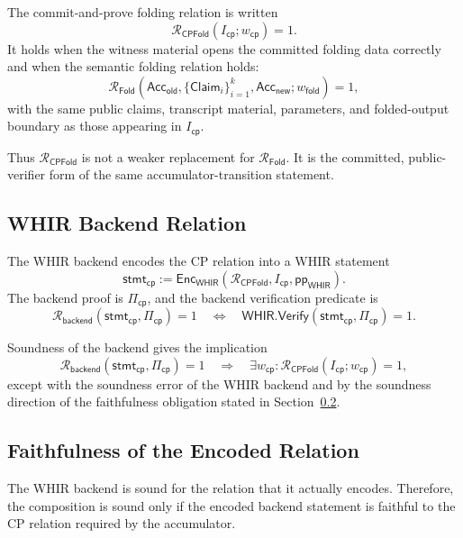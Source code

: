 \documentclass[11pt]{article}
\theoremstyle{definition}
\newcommand{\WHIR}{\mathsf{WHIR}}
\newcommand{\Acc}{\mathsf{Acc}}
\newcommand{\Verify}{\mathsf{Verify}}
\newcommand{\Rfold}{\mathcal{R}_{\mathsf{Fold}}}
\newcommand{\Rcp}{\mathcal{R}_{\mathsf{CPFold}}}
\newcommand{\Rbackend}{\mathcal{R}_{\mathsf{backend}}}
\begin{document}
The commit-and-prove folding relation is written
\[
  \Rcp(I_{\mathsf{cp}};w_{\mathsf{cp}})=1.
\]
It holds when the witness material opens the committed folding data correctly
and when the semantic folding relation holds:
\[
  \Rfold\!\left(
    \Acc_{\mathsf{old}},
    \{\mathsf{Claim}_i\}_{i=1}^k,
    \Acc_{\mathsf{new}};
    w_{\mathsf{fold}}
  \right)=1,
\]
with the same public claims, transcript material, parameters, and folded-output
boundary as those appearing in $I_{\mathsf{cp}}$.

Thus $\Rcp$ is not a weaker replacement for $\Rfold$. It is the committed,
public-verifier form of the same accumulator-transition statement.

\subsection{WHIR Backend Relation}
\label{sec:whir-backend-relation}
The WHIR backend encodes the CP relation into a WHIR statement
\[
  \mathsf{stmt}_{\mathsf{cp}}
  :=
  \mathsf{Enc}_{\WHIR}
  \left(
    \Rcp,
    I_{\mathsf{cp}},
    \mathsf{pp}_{\WHIR}
  \right).
\]
The backend proof is $\Pi_{\mathsf{cp}}$, and the backend verification predicate
is
\[
  \Rbackend(\mathsf{stmt}_{\mathsf{cp}},\Pi_{\mathsf{cp}})=1
  \quad\Longleftrightarrow\quad
  \WHIR.\Verify(\mathsf{stmt}_{\mathsf{cp}},\Pi_{\mathsf{cp}})=1.
\]

Soundness of the backend gives the implication
\[
  \Rbackend(\mathsf{stmt}_{\mathsf{cp}},\Pi_{\mathsf{cp}})=1
  \quad\Longrightarrow\quad
  \exists w_{\mathsf{cp}} :
  \Rcp(I_{\mathsf{cp}};w_{\mathsf{cp}})=1,
\]
except with the soundness error of the WHIR backend and by the soundness
direction of the faithfulness obligation stated in
Section~\ref{sec:faithfulness-of-encoded-relation}.

\subsection{Faithfulness of the Encoded Relation}
\label{sec:faithfulness-of-encoded-relation}
The WHIR backend is sound for the relation that it actually encodes. Therefore,
the composition is sound only if the encoded backend statement is faithful to the
CP relation required by the accumulator.
\end{document}
